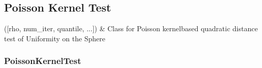 \documentclass[letterpaper,10pt,english,openany,oneside]{sphinxmanual}
\begin{document}
\subsection{Poisson Kernel Test}
\label{\detokenize{api_reference/index:poisson-kernel-test}}\label{\detokenize{api_reference/index:module-QuadratiK.poisson_kernel_test}}

\begin{savenotes}\sphinxattablestart
\sphinxthistablewithglobalstyle
\sphinxthistablewithnovlinesstyle
\centering
\begin{tabulary}{\linewidth}[t]{}
\sphinxtoprule
\sphinxtableatstartofbodyhook
\sphinxAtStartPar
{\hyperref[\detokenize{api_reference/generated/QuadratiK.poisson_kernel_test.PoissonKernelTest:QuadratiK.poisson_kernel_test.PoissonKernelTest}]{}}({[}rho, num\_iter, quantile, ...{]})
&
\sphinxAtStartPar
Class for Poisson kernel\sphinxhyphen{}based quadratic distance  test of Uniformity on the Sphere
\\
\sphinxbottomrule
\end{tabulary}
\sphinxtableafterendhook\par
\sphinxattableend\end{savenotes}

\sphinxstepscope


\subsubsection{PoissonKernelTest}
\label{\detokenize{api_reference/generated/QuadratiK.poisson_kernel_test.PoissonKernelTest:poissonkerneltest}}\label{\detokenize{api_reference/generated/QuadratiK.poisson_kernel_test.PoissonKernelTest::doc}}
\end{document}
